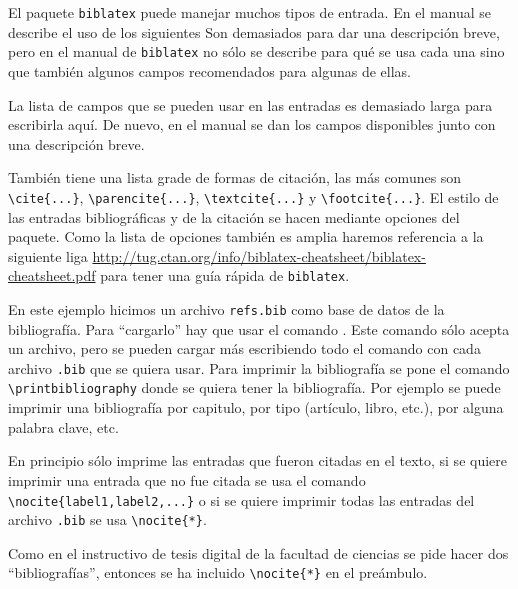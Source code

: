 El paquete \texttt{biblatex} puede manejar muchos tipos de entrada. En el
manual se describe el uso de los siguientes
Son demasiados para dar una descripción breve, pero en el manual de
\texttt{biblatex} no sólo se describe para qué se usa cada una sino que
también algunos campos recomendados para algunas de ellas.

La lista de campos que se pueden usar en las entradas es demasiado larga para
escribirla aquí. De nuevo, en el manual se dan los campos disponibles junto
con una descripción breve.

También tiene una lista grade de formas de citación, las más comunes son
\verb|\cite{...}|, \verb|\parencite{...}|, \verb|\textcite{...}| y
\verb|\footcite{...}|. El estilo de las entradas bibliográficas y de la
citación se hacen mediante opciones del paquete. Como la lista de opciones
también es amplia haremos referencia a la siguiente liga
\url{http://tug.ctan.org/info/biblatex-cheatsheet/biblatex-cheatsheet.pdf}
para tener una guía rápida de \texttt{biblatex}.

En este ejemplo hicimos un archivo \texttt{refs.bib} como base de datos de la
bibliografía. Para \enquote{cargarlo} hay que usar el comando
\verb||. Este comando sólo acepta un archivo, pero
se pueden cargar más escribiendo todo el comando con cada archivo
\texttt{.bib} que se quiera usar. Para imprimir la bibliografía se pone el
comando \verb|\printbibliography| donde se quiera tener la bibliografía. Por
ejemplo se puede imprimir una bibliografía por capitulo, por tipo
(artículo, libro, etc.), por alguna palabra clave, etc.

En principio sólo imprime las entradas que fueron citadas en el texto, si se
quiere imprimir una entrada que no fue citada se usa el comando
\verb|\nocite{label1,label2,...}| o si se quiere imprimir todas las entradas
del archivo \texttt{.bib} se usa \verb|\nocite{*}|. 

Como en el instructivo de tesis digital de la facultad de ciencias se pide 
hacer dos \enquote{bibliografías}, entonces se ha incluido \verb|\nocite{*}| en 
el preámbulo.

